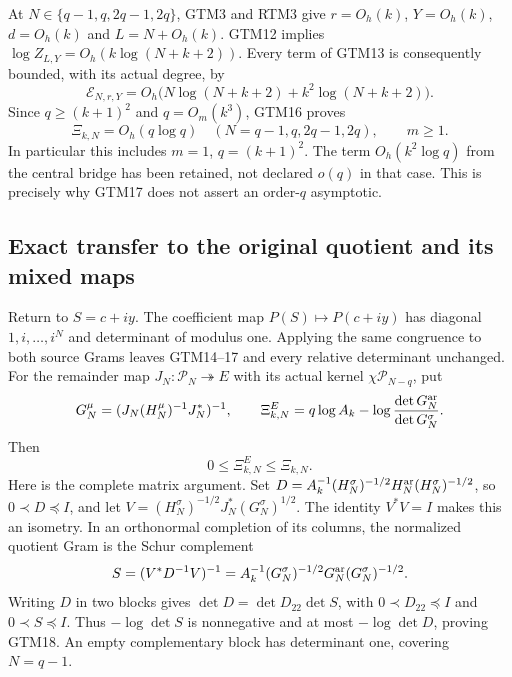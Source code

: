 At $N\in\{q-1,q,2q-1,2q\}$, GTM3 and RTM3 give
$r=O_h(k)$, $Y=O_h(k)$, $d=O_h(k)$ and $L=N+O_h(k)$.
GTM12 implies $\log Z_{L,Y}=O_h(k\log(N+k+2))$.
Every term of GTM13 is consequently bounded, with its actual degree,
by
\[
 \mathcal E_{N,r,Y}
 =O_h\bigl(N\log(N+k+2)+k^2\log(N+k+2)\bigr).
\]
Since $q\ge(k+1)^2$ and $q=O_m(k^3)$, GTM16 proves
\begin{equation}\tag{GTM17}
 \boxed{\Xi_{k,N}=O_h(q\log q)
       \quad(N=q-1,q,2q-1,2q),\qquad m\ge1.}
\end{equation}
In particular this includes $m=1$, $q=(k+1)^2$.
The term $O_h(k^2\log q)$ from the central bridge has been retained,
not declared $o(q)$ in that case.  This is precisely why GTM17 does
not assert an order-$q$ asymptotic.

\subsection{Exact transfer to the original quotient and its mixed maps}

Return to $S=c+iy$.  The coefficient map
$P(S)\mapsto P(c+iy)$ has diagonal $1,i,\ldots,i^N$ and
determinant of modulus one.  Applying the same congruence to both
source Grams leaves GTM14--17 and every relative determinant unchanged.
For the remainder map $J_N:\mathcal P_N\twoheadrightarrow E$
with its actual kernel $\chi\mathcal P_{N-q}$, put
\[
 G_N^\mu=(J_N(H_N^\mu)^{-1}J_N^*)^{-1},\qquad
 \Xi_{k,N}^{E}=q\log A_k-\log\frac{\det G_N^{\rm ar}}{\det G_N^\sigma}.
\]
Then
\begin{equation}\tag{GTM18}
 0\le\Xi_{k,N}^{E}\le\Xi_{k,N}.
\end{equation}
Here is the complete matrix argument.  Set
$D=A_k^{-1}(H_N^\sigma)^{-1/2}H_N^{\rm ar}(H_N^\sigma)^{-1/2}$,
so $0\prec D\preceq I$, and let
$V=(H_N^\sigma)^{-1/2}J_N^*(G_N^\sigma)^{1/2}$.
The identity $V^*V=I$ makes this an isometry.
In an orthonormal completion of its columns, the normalized quotient
Gram is the Schur complement
\[
 S=(V^*D^{-1}V)^{-1}
  =A_k^{-1}(G_N^\sigma)^{-1/2}G_N^{\rm ar}(G_N^\sigma)^{-1/2}.
\]
Writing $D$ in two blocks gives $\det D=\det D_{22}\det S$,
with $0\prec D_{22}\preceq I$ and $0\prec S\preceq I$.
Thus $-\log\det S$ is nonnegative and at most
$-\log\det D$, proving GTM18.  An empty complementary block
has determinant one, covering $N=q-1$.

